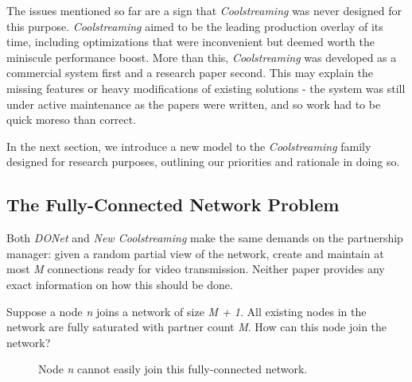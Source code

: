 \documentclass[12pt,a4paper]{article}
\begin{document}
The issues mentioned so far are a sign that \textit{Coolstreaming} was never designed for this purpose. \textit{Coolstreaming} aimed to be the leading production overlay of its time, including optimizations that were inconvenient but deemed worth the miniscule performance boost. More than this, \textit{Coolstreaming} was developed as a commercial system first and a research paper second. This may explain the missing features or heavy modifications of existing solutions - the system was still under active maintenance as the papers were written, and so work had to be quick moreso than correct.

In the next section, we introduce a new model to the \textit{Coolstreaming} family designed for research purposes, outlining our priorities and rationale in doing so.

\subsection{The Fully-Connected Network Problem} \label{problems:fcn}
Both \textit{DONet} and \textit{New Coolstreaming} make the same demands on the partnership manager: given a random partial view of the network, create and maintain at most \textit{M} connections ready for video transmission. Neither paper provides any exact information on how this should be done.

Suppose a node \textit{n} joins a network of size \textit{M + 1}. All existing nodes in the network are fully saturated with partner count \textit{M}. How can this node join the network?

\begin{figure}[!ht]
	\centering
	\caption{Node \textit{n} cannot easily join this fully-connected network.}
	\label{fig1}
\end{figure}
\end{document}

